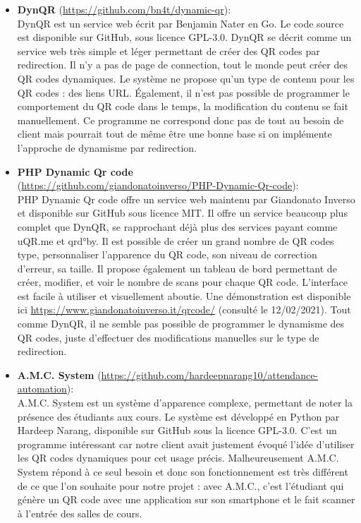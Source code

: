 \documentclass[a4paper,12pt]{article}
\begin{document}
\begin{itemize}
    \item \textbf{DynQR} (\url{https://github.com/bn4t/dynamic-qr}):\\ 
    DynQR est un service web écrit par Benjamin Nater en Go. Le code source est disponible sur GitHub, sous licence GPL-3.0. DynQR se décrit comme un service web très simple et léger permettant de créer des QR codes par redirection. Il n'y a pas de page de connection, tout le monde peut créer des QR codes dynamiques. Le système ne propose qu'un type de contenu pour les QR codes : des liens URL. Également, il n'est pas possible de programmer le comportement du QR code dans le temps, la modification du contenu se fait manuellement. Ce programme ne correspond donc pas de tout au besoin de client mais pourrait tout de même être une bonne base si on implémente l'approche de dynamisme par redirection.\\
    
    \item \textbf{PHP Dynamic Qr code}\\(\url{https://github.com/giandonatoinverso/PHP-Dynamic-Qr-code}):\\
    PHP Dynamic Qr code offre un service web maintenu par Giandonato Inverso et disponible sur GitHub sous licence MIT. Il offre un service beaucoup plus complet que DynQR, se rapprochant déjà plus des services payant comme uQR.me et qrd°by. Il est possible de créer un grand nombre de QR codes type, personnaliser l'apparence du QR code, son niveau de correction d'erreur, sa taille. Il propose également un tableau de bord permettant de créer, modifier, et voir le nombre de scans pour chaque QR code. L'interface est facile à utiliser et visuellement aboutie. Une démonstration est disponible ici \url{https://www.giandonatoinverso.it/qrcode/} (consulté le 12/02/2021). Tout comme DynQR, il ne semble pas possible de programmer le dynamisme des QR codes, juste d'effectuer des modifications manuelles sur le type de redirection.
    
    \item \textbf{A.M.C. System} (\url{https://github.com/hardeepnarang10/attendance-automation}):\\
    A.M.C. System est un système d'apparence complexe, permettant de noter la présence des étudiants aux cours. Le système est développé en Python par Hardeep Narang, disponible sur GitHub sous la licence GPL-3.0. C'est un programme intéressant car notre client avait justement évoqué l'idée d'utiliser les QR codes dynamiques pour cet usage précis. Malheureusement A.M.C. System répond à ce seul besoin et donc son fonctionnement est très différent de ce que l'on souhaite pour notre projet : avec  A.M.C., c'est l'étudiant qui génère un QR code avec une application sur son smartphone et le fait scanner à l'entrée des salles de cours.
    
\end{itemize}
\end{document}
